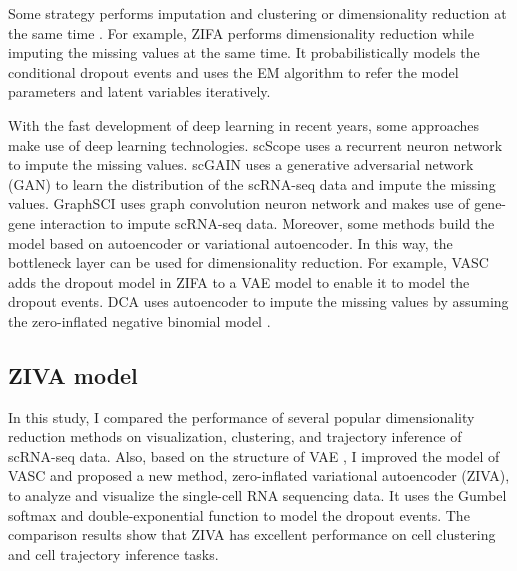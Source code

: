 Some strategy performs imputation and clustering or dimensionality reduction at the same time \cite{lin2017cidr}. For example, ZIFA \cite{Pierson2015} performs dimensionality reduction while imputing the missing values at the same time. It probabilistically models the conditional dropout events and uses the EM algorithm \cite{mclachlan2007algorithm} to refer the model parameters and latent variables iteratively. 

With the fast development of deep learning in recent years, some approaches make use of deep learning technologies. scScope \cite{Deng2019} uses a recurrent neuron network to impute the missing values. scGAIN \cite{gunady2019scgain} uses a generative adversarial network (GAN) to learn the distribution of the scRNA-seq data and impute the missing values. GraphSCI \cite{rao2020imputing} uses graph convolution neuron network and makes use of gene-gene interaction to impute scRNA-seq data. Moreover, some methods build the model based on autoencoder or variational autoencoder. In this way, the bottleneck layer can be used for dimensionality reduction. For example, VASC \cite{Wang2018} adds the dropout model in ZIFA to a VAE model to enable it to model the dropout events. DCA \cite{Eraslan2019a} uses autoencoder to impute the missing values by assuming the zero-inflated negative binomial model \cite{Hafemeister2019}. 

\subsection{ZIVA model}
In this study, I compared the performance of several popular dimensionality reduction methods on visualization, clustering, and trajectory inference of scRNA-seq data. Also, based on the structure of VAE \cite{Kingma2014}, I improved the model of VASC \cite{Wang2018} and proposed a new method, zero-inflated variational autoencoder (ZIVA), to analyze and visualize the single-cell RNA sequencing data. It uses the Gumbel softmax and double-exponential function to model the dropout events. The comparison results show that ZIVA has excellent performance on cell clustering and cell trajectory inference tasks.